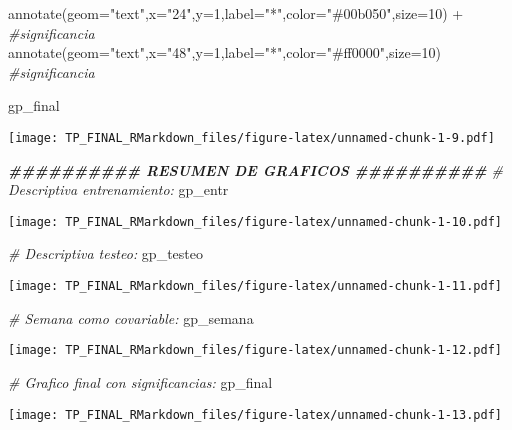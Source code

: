\documentclass[
]{article}
\newenvironment{Shaded}{\begin{snugshade}}{\end{snugshade}}
\newcommand{\AttributeTok}[1]{\textcolor[rgb]{0.77,0.63,0.00}{#1}}
\newcommand{\CommentTok}[1]{\textcolor[rgb]{0.56,0.35,0.01}{\textit{#1}}}
\newcommand{\DecValTok}[1]{\textcolor[rgb]{0.00,0.00,0.81}{#1}}
\newcommand{\DocumentationTok}[1]{\textcolor[rgb]{0.56,0.35,0.01}{\textbf{\textit{#1}}}}
\newcommand{\FunctionTok}[1]{\textcolor[rgb]{0.00,0.00,0.00}{#1}}
\newcommand{\NormalTok}[1]{#1}
\newcommand{\SpecialCharTok}[1]{\textcolor[rgb]{0.00,0.00,0.00}{#1}}
\newcommand{\StringTok}[1]{\textcolor[rgb]{0.31,0.60,0.02}{#1}}
\begin{document}
\begin{Shaded}
\begin{Highlighting}[]
  \FunctionTok{annotate}\NormalTok{(}\AttributeTok{geom=}\StringTok{"text"}\NormalTok{,}\AttributeTok{x=}\StringTok{"24"}\NormalTok{,}\AttributeTok{y=}\DecValTok{1}\NormalTok{,}\AttributeTok{label=}\StringTok{"*"}\NormalTok{,}\AttributeTok{color=}\StringTok{"\#00b050"}\NormalTok{,}\AttributeTok{size=}\DecValTok{10}\NormalTok{) }\SpecialCharTok{+} \CommentTok{\#significancia}
  \FunctionTok{annotate}\NormalTok{(}\AttributeTok{geom=}\StringTok{"text"}\NormalTok{,}\AttributeTok{x=}\StringTok{"48"}\NormalTok{,}\AttributeTok{y=}\DecValTok{1}\NormalTok{,}\AttributeTok{label=}\StringTok{"*"}\NormalTok{,}\AttributeTok{color=}\StringTok{"\#ff0000"}\NormalTok{,}\AttributeTok{size=}\DecValTok{10}\NormalTok{)   }\CommentTok{\#significancia}
  
\NormalTok{gp\_final}
\end{Highlighting}
\end{Shaded}

\texttt{[image: TP\_FINAL\_RMarkdown\_files/figure-latex/unnamed-chunk-1-9.pdf]}

\begin{Shaded}
\begin{Highlighting}[]
\DocumentationTok{\#\#\#\#\#\#\#\#\#\# RESUMEN DE GRAFICOS \#\#\#\#\#\#\#\#\#\# }
\CommentTok{\# Descriptiva entrenamiento:}
\NormalTok{gp\_entr}
\end{Highlighting}
\end{Shaded}

\texttt{[image: TP\_FINAL\_RMarkdown\_files/figure-latex/unnamed-chunk-1-10.pdf]}

\begin{Shaded}
\begin{Highlighting}[]
\CommentTok{\# Descriptiva testeo:}
\NormalTok{gp\_testeo}
\end{Highlighting}
\end{Shaded}

\texttt{[image: TP\_FINAL\_RMarkdown\_files/figure-latex/unnamed-chunk-1-11.pdf]}

\begin{Shaded}
\begin{Highlighting}[]
\CommentTok{\# Semana como covariable:}
\NormalTok{gp\_semana}
\end{Highlighting}
\end{Shaded}

\texttt{[image: TP\_FINAL\_RMarkdown\_files/figure-latex/unnamed-chunk-1-12.pdf]}

\begin{Shaded}
\begin{Highlighting}[]
\CommentTok{\# Grafico final con significancias:}
\NormalTok{gp\_final}
\end{Highlighting}
\end{Shaded}

\texttt{[image: TP\_FINAL\_RMarkdown\_files/figure-latex/unnamed-chunk-1-13.pdf]}
\end{document}
